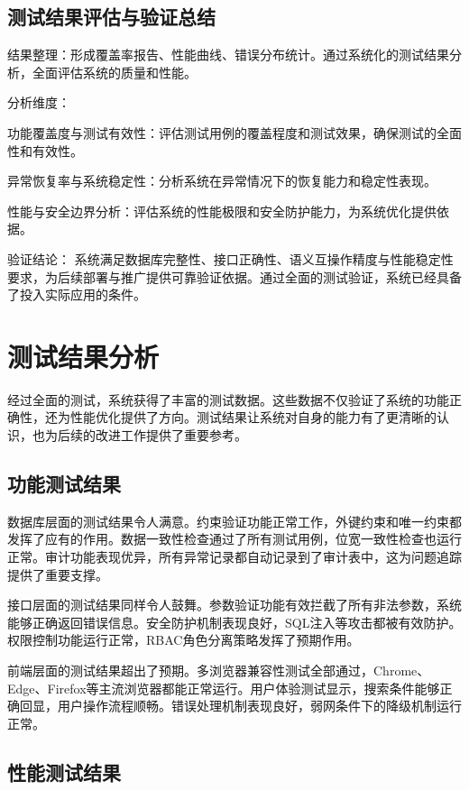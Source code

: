 \subsection{测试结果评估与验证总结}

结果整理：形成覆盖率报告、性能曲线、错误分布统计。通过系统化的测试结果分析，全面评估系统的质量和性能。

分析维度：

功能覆盖度与测试有效性：评估测试用例的覆盖程度和测试效果，确保测试的全面性和有效性。

异常恢复率与系统稳定性：分析系统在异常情况下的恢复能力和稳定性表现。

性能与安全边界分析：评估系统的性能极限和安全防护能力，为系统优化提供依据。

验证结论：
系统满足数据库完整性、接口正确性、语义互操作精度与性能稳定性要求，为后续部署与推广提供可靠验证依据。通过全面的测试验证，系统已经具备了投入实际应用的条件。

\section{测试结果分析}

经过全面的测试，系统获得了丰富的测试数据。这些数据不仅验证了系统的功能正确性，还为性能优化提供了方向。测试结果让系统对自身的能力有了更清晰的认识，也为后续的改进工作提供了重要参考。

\subsection{功能测试结果}

数据库层面的测试结果令人满意。约束验证功能正常工作，外键约束和唯一约束都发挥了应有的作用。数据一致性检查通过了所有测试用例，位宽一致性检查也运行正常。审计功能表现优异，所有异常记录都自动记录到了审计表中，这为问题追踪提供了重要支撑。

接口层面的测试结果同样令人鼓舞。参数验证功能有效拦截了所有非法参数，系统能够正确返回错误信息。安全防护机制表现良好，SQL注入等攻击都被有效防护。权限控制功能运行正常，RBAC角色分离策略发挥了预期作用。

前端层面的测试结果超出了预期。多浏览器兼容性测试全部通过，Chrome、Edge、Firefox等主流浏览器都能正常运行。用户体验测试显示，搜索条件能够正确回显，用户操作流程顺畅。错误处理机制表现良好，弱网条件下的降级机制运行正常。

\subsection{性能测试结果}

